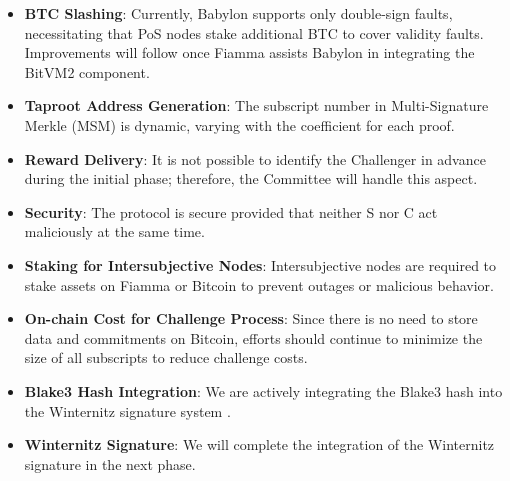 \begin{itemize}
    \item \textbf{BTC Slashing}: Currently, Babylon supports only double-sign faults, necessitating that PoS nodes stake additional BTC to cover validity faults. Improvements will follow once Fiamma assists Babylon in integrating the BitVM2 component.
    \item \textbf{Taproot Address Generation}: The subscript number in Multi-Signature Merkle (MSM) is dynamic, varying with the coefficient for each proof.
    \item \textbf{Reward Delivery}: It is not possible to identify the Challenger in advance during the initial phase; therefore, the Committee will handle this aspect.
    \item \textbf{Security}: The protocol is secure provided that neither S nor C act maliciously at the same time.
    \item \textbf{Staking for Intersubjective Nodes}: Intersubjective nodes are required to stake assets on Fiamma or Bitcoin to prevent outages or malicious behavior.
    \item \textbf{On-chain Cost for Challenge Process}: Since there is no need to store data and commitments on Bitcoin, efforts should continue to minimize the size of all subscripts to reduce challenge costs.
    \item \textbf{Blake3 Hash Integration}: We are actively integrating the Blake3 hash into the Winternitz signature system \cite{website:witernitz}.
    \item \textbf{Winternitz Signature}: We will complete the integration of the Winternitz signature in the next phase.
\end{itemize}
